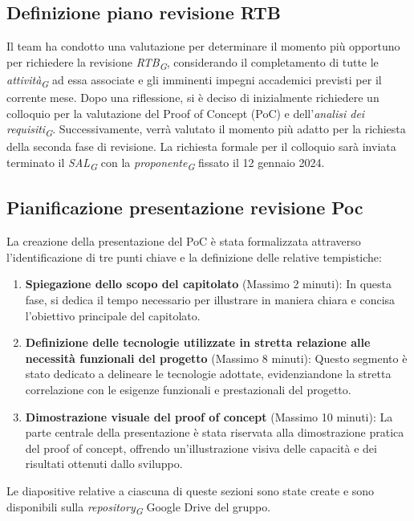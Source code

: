 \documentclass{article}
\begin{document}
\subsection{Definizione piano revisione RTB}
Il team ha condotto una valutazione per determinare il momento più opportuno per richiedere la revisione \textit{RTB}\textsubscript{\textit{G}}, considerando il completamento di tutte le \textit{attività}\textsubscript{\textit{G}} ad essa associate e gli imminenti impegni accademici previsti per il corrente mese.
Dopo una riflessione, si è deciso di inizialmente richiedere un colloquio per la valutazione del Proof of Concept (PoC) e dell'\textit{analisi dei requisiti}\textsubscript{\textit{G}}. Successivamente, verrà valutato il momento più adatto per la richiesta della seconda fase di revisione.
La richiesta formale per il colloquio sarà inviata terminato il \textit{SAL}\textsubscript{\textit{G}} con la \textit{proponente}\textsubscript{\textit{G}} fissato il 12 gennaio 2024.
\subsection{Pianificazione presentazione revisione Poc}
La creazione della presentazione del PoC è stata formalizzata attraverso l'identificazione di tre punti chiave e la definizione delle relative tempistiche:

\begin{enumerate}
    \item \textbf{Spiegazione dello scopo del capitolato} (Massimo 2 minuti): In questa fase, si dedica il tempo necessario per illustrare in maniera chiara e concisa l'obiettivo principale del capitolato.
    
    \item \textbf{Definizione delle tecnologie utilizzate in stretta relazione alle necessità funzionali del progetto} (Massimo 8 minuti): Questo segmento è stato dedicato a delineare le tecnologie adottate, evidenziandone la stretta correlazione con le esigenze funzionali e prestazionali del progetto.
    
    \item \textbf{Dimostrazione visuale del proof of concept} (Massimo 10 minuti): La parte centrale della presentazione è stata riservata alla dimostrazione pratica del proof of concept, offrendo un'illustrazione visiva delle capacità e dei risultati ottenuti dallo sviluppo.
\end{enumerate}

Le diapositive relative a ciascuna di queste sezioni sono state create e sono disponibili sulla \textit{repository}\textsubscript{\textit{G}} Google Drive del gruppo.
\end{document}

